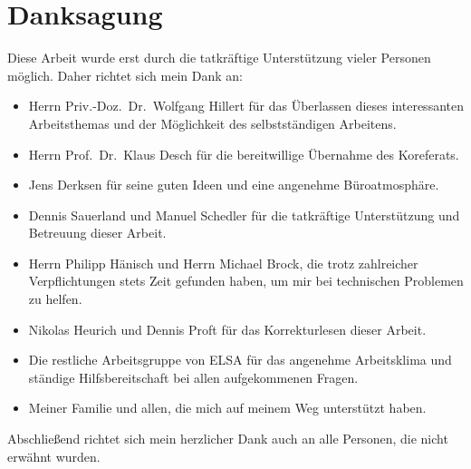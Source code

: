\chapter*{Danksagung}
\label{sec:danksagung}
Diese Arbeit wurde erst durch die tatkräftige Unterstützung vieler Personen möglich.
Daher richtet sich mein Dank an:
\begin{itemize}
	\item Herrn Priv.-Doz.\ Dr.\ Wolfgang Hillert für das Überlassen dieses interessanten Arbeitsthemas und der Möglichkeit des selbstständigen Arbeitens.
	
	\item Herrn Prof.\ Dr.\ Klaus Desch für die bereitwillige Übernahme des Koreferats.
	
	\item Jens Derksen für seine guten Ideen und eine angenehme Büroatmosphäre.
	
	\item Dennis Sauerland und Manuel Schedler für die tatkräftige Unterstützung und Betreuung dieser Arbeit.
	
	\item Herrn Philipp Hänisch und Herrn Michael Brock, die trotz zahlreicher Verpflichtungen stets Zeit gefunden haben, um mir bei technischen Problemen zu helfen.
	
	\item Nikolas Heurich und Dennis Proft für das Korrekturlesen dieser Arbeit.
	
	\item Die restliche Arbeitsgruppe von ELSA für das angenehme Arbeitsklima und ständige Hilfsbereitschaft bei allen aufgekommenen Fragen.
	
	\item Meiner Familie und allen, die mich auf meinem Weg unterstützt haben.
\end{itemize}
Abschließend richtet sich mein herzlicher Dank auch an alle Personen, die nicht erwähnt wurden.